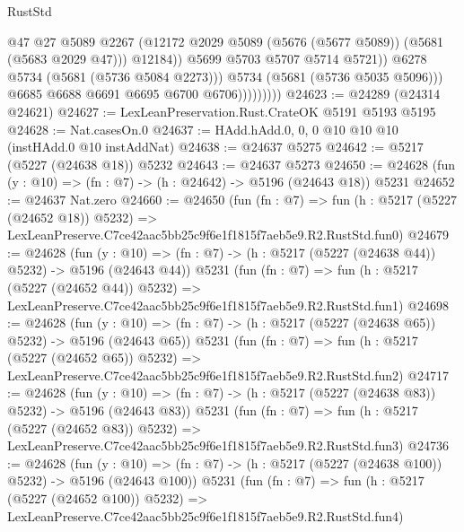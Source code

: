 \begin{lexlean}{RustStd}
\begin{coremodule}
                                  @47
                                  @27
                                  @5089
                                  @2267
                                  (@12172
                                    @2029
                                    @5089
                                    (@5676 (@5677 @5089))
                                    (@5681 (@5683 @2029 @47)))
                                  @12184))
                              @5699
                              @5703
                              @5707
                              @5714
                              @5721))
                          @6278
                          @5734
                          (@5681 (@5736 @5084 @2273)))
                        @5734
                        (@5681 (@5736 @5035 @5096)))
                      @6685
                      @6688
                      @6691
                      @6695
                      @6700
                      @6706)))))))))
@24623 := @24289 (@24314 @24621)
@24627 := LexLeanPreservation.Rust.CrateOK @5191 @5193 @5195
@24628 := Nat.casesOn.{0}
@24637 := HAdd.hAdd.{0, 0, 0} @10 @10 @10 (instHAdd.{0} @10 instAddNat)
@24638 := @24637 @5275
@24642 := @5217 (@5227 (@24638 @18)) @5232
@24643 := @24637 @5273
@24650 := @24628 (fun (y : @10) => (fn : @7) -> (h : @24642) -> @5196 (@24643 @18)) @5231
@24652 := @24637 Nat.zero
@24660 := @24650
    (fun (fn : @7) =>
    fun (h : @5217 (@5227 (@24652 @18)) @5232) =>
    LexLeanPreserve.C7ce42aac5bb25c9f6e1f1815f7aeb5e9.R2.RustStd.fun0)
@24679 := @24628
    (fun (y : @10) => (fn : @7) -> (h : @5217 (@5227 (@24638 @44)) @5232) -> @5196 (@24643 @44))
    @5231
    (fun (fn : @7) =>
    fun (h : @5217 (@5227 (@24652 @44)) @5232) =>
    LexLeanPreserve.C7ce42aac5bb25c9f6e1f1815f7aeb5e9.R2.RustStd.fun1)
@24698 := @24628
    (fun (y : @10) => (fn : @7) -> (h : @5217 (@5227 (@24638 @65)) @5232) -> @5196 (@24643 @65))
    @5231
    (fun (fn : @7) =>
    fun (h : @5217 (@5227 (@24652 @65)) @5232) =>
    LexLeanPreserve.C7ce42aac5bb25c9f6e1f1815f7aeb5e9.R2.RustStd.fun2)
@24717 := @24628
    (fun (y : @10) => (fn : @7) -> (h : @5217 (@5227 (@24638 @83)) @5232) -> @5196 (@24643 @83))
    @5231
    (fun (fn : @7) =>
    fun (h : @5217 (@5227 (@24652 @83)) @5232) =>
    LexLeanPreserve.C7ce42aac5bb25c9f6e1f1815f7aeb5e9.R2.RustStd.fun3)
@24736 := @24628
    (fun (y : @10) => (fn : @7) -> (h : @5217 (@5227 (@24638 @100)) @5232) -> @5196 (@24643 @100))
    @5231
    (fun (fn : @7) =>
    fun (h : @5217 (@5227 (@24652 @100)) @5232) =>
    LexLeanPreserve.C7ce42aac5bb25c9f6e1f1815f7aeb5e9.R2.RustStd.fun4)

\end{coremodule}
\end{lexlean}
